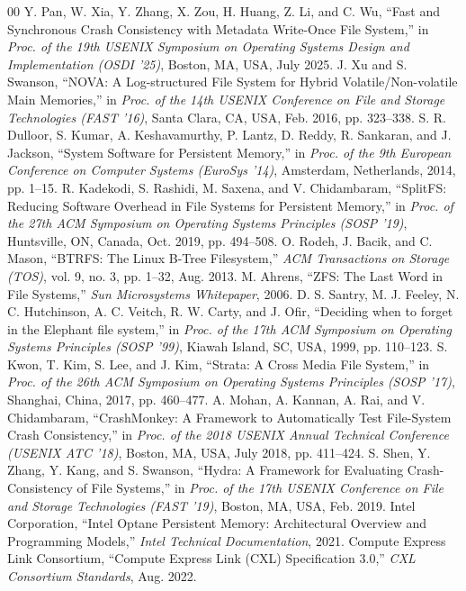 \documentclass[conference]{IEEEtran}
\begin{document}
\begin{thebibliography}{00}
 Y. Pan, W. Xia, Y. Zhang, X. Zou, H. Huang, Z. Li, and C. Wu, ``Fast and Synchronous Crash Consistency with Metadata Write-Once File System,'' in \emph{Proc. of the 19th USENIX Symposium on Operating Systems Design and Implementation (OSDI '25)}, Boston, MA, USA, July 2025.
 J. Xu and S. Swanson, ``NOVA: A Log-structured File System for Hybrid Volatile/Non-volatile Main Memories,'' in \emph{Proc. of the 14th USENIX Conference on File and Storage Technologies (FAST '16)}, Santa Clara, CA, USA, Feb. 2016, pp. 323--338.
 S. R. Dulloor, S. Kumar, A. Keshavamurthy, P. Lantz, D. Reddy, R. Sankaran, and J. Jackson, ``System Software for Persistent Memory,'' in \emph{Proc. of the 9th European Conference on Computer Systems (EuroSys '14)}, Amsterdam, Netherlands, 2014, pp. 1--15.
 R. Kadekodi, S. Rashidi, M. Saxena, and V. Chidambaram, ``SplitFS: Reducing Software Overhead in File Systems for Persistent Memory,'' in \emph{Proc. of the 27th ACM Symposium on Operating Systems Principles (SOSP '19)}, Huntsville, ON, Canada, Oct. 2019, pp. 494--508.
 O. Rodeh, J. Bacik, and C. Mason, ``BTRFS: The Linux B-Tree Filesystem,'' \emph{ACM Transactions on Storage (TOS)}, vol. 9, no. 3, pp. 1--32, Aug. 2013.
 M. Ahrens, ``ZFS: The Last Word in File Systems,'' \emph{Sun Microsystems Whitepaper}, 2006.
 D. S. Santry, M. J. Feeley, N. C. Hutchinson, A. C. Veitch, R. W. Carty, and J. Ofir, ``Deciding when to forget in the Elephant file system,'' in \emph{Proc. of the 17th ACM Symposium on Operating Systems Principles (SOSP '99)}, Kiawah Island, SC, USA, 1999, pp. 110--123.
 S. Kwon, T. Kim, S. Lee, and J. Kim, ``Strata: A Cross Media File System,'' in \emph{Proc. of the 26th ACM Symposium on Operating Systems Principles (SOSP '17)}, Shanghai, China, 2017, pp. 460--477.
 A. Mohan, A. Kannan, A. Rai, and V. Chidambaram, ``CrashMonkey: A Framework to Automatically Test File-System Crash Consistency,'' in \emph{Proc. of the 2018 USENIX Annual Technical Conference (USENIX ATC '18)}, Boston, MA, USA, July 2018, pp. 411--424.
 S. Shen, Y. Zhang, Y. Kang, and S. Swanson, ``Hydra: A Framework for Evaluating Crash-Consistency of File Systems,'' in \emph{Proc. of the 17th USENIX Conference on File and Storage Technologies (FAST '19)}, Boston, MA, USA, Feb. 2019.
 Intel Corporation, ``Intel Optane Persistent Memory: Architectural Overview and Programming Models,'' \emph{Intel Technical Documentation}, 2021.
 Compute Express Link Consortium, ``Compute Express Link (CXL) Specification 3.0,'' \emph{CXL Consortium Standards}, Aug. 2022.
\end{thebibliography}
\end{document}
